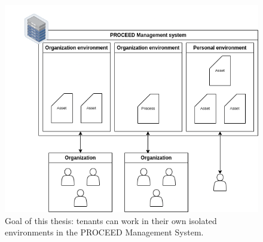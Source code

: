 \begin{figure}[H]
	\centering
	\includegraphics[scale=0.45]{images/proceed-workspaces-v2.drawio.png}
	\caption{Goal of this thesis: tenants can work in their own isolated environments in
		the PROCEED Management System.}
	\label{fig:proceed-envitonments-overview}
\end{figure}


%
%

